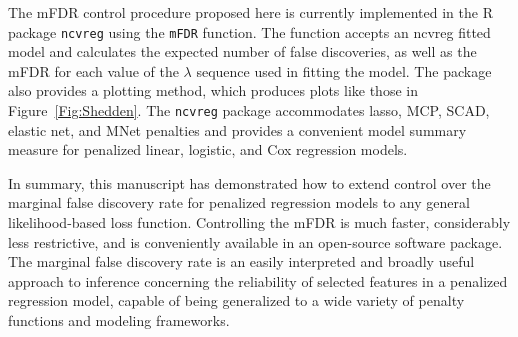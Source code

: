 The mFDR control procedure proposed here is currently implemented in the R package {\tt ncvreg} \citep{Breheny2011} using the {\tt mFDR} function. The function accepts an ncvreg fitted model and calculates the expected number of false discoveries, as well as the mFDR for each value of the $\lambda$ sequence used in fitting the model.  The package also provides a plotting method, which produces plots like those in Figure~\ref{Fig:Shedden}.  The {\tt ncvreg} package accommodates lasso, MCP, SCAD, elastic net, and MNet \citep{Huang2016} penalties and provides a convenient model summary measure for penalized linear, logistic, and Cox regression models.

In summary, this manuscript has demonstrated how to extend control over the marginal false discovery rate for penalized regression models to any general likelihood-based loss function.  Controlling the mFDR is much faster, considerably less restrictive, and is conveniently available in an open-source software package.  The marginal false discovery rate is an easily interpreted and broadly useful approach to inference concerning the reliability of selected features in a penalized regression model, capable of being generalized to a wide variety of penalty functions and modeling frameworks.
